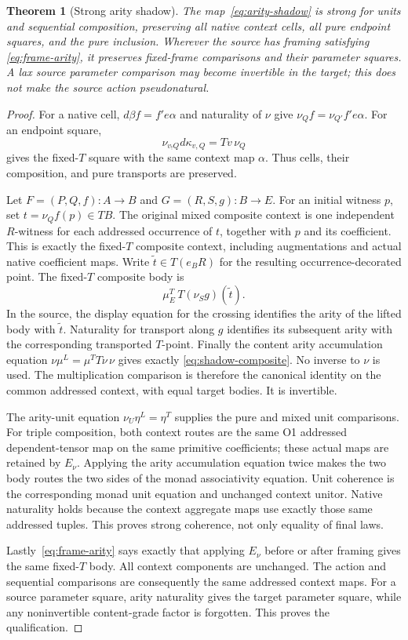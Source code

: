 \documentclass[11pt,a4paper]{article}
\newtheorem{theorem}{Theorem}[section]
\theoremstyle{definition}
\begin{document}
\begin{theorem}[Strong arity shadow]\label{thm:arity-shadow}
The map~\eqref{eq:arity-shadow} is strong for units and sequential
composition, preserving all native context cells, all pure endpoint squares,
and the pure inclusion. Wherever the source has framing satisfying
\eqref{eq:frame-arity}, it preserves fixed-frame comparisons and their
parameter squares. A lax source parameter comparison may become invertible
in the target; this does not make the source action pseudonatural.
\end{theorem}
\begin{proof}
For a native cell, $d\beta f=f'e\alpha$ and naturality of $\nu$ give
$\nu_Qf=\nu_{Q'}f'e\alpha$. For an endpoint square,
\[
 \nu_{v_!Q}d\kappa_{v,Q}=Tv\,\nu_Q
\]
gives the fixed-$T$ square with the same context map $\alpha$.
Thus cells, their composition, and pure transports are preserved.

Let $F=(P,Q,f):A\to B$ and $G=(R,S,g):B\to E$. For an initial witness
$p$, set $t=\nu_Qf(p)\in TB$. The original mixed composite context is
one independent $R$-witness for each addressed occurrence of $t$, together
with $p$ and its coefficient. This is exactly the fixed-$T$ composite
context, including augmentations and actual native coefficient maps.
Write $\widetilde t\in T(e_BR)$ for the resulting occurrence-decorated
point. The fixed-$T$ composite body is
\begin{equation}\label{eq:shadow-composite}
 \mu^T_E\,T(\nu_Sg)(\widetilde t).
\end{equation}
In the source, the display equation for the crossing identifies the arity
of the lifted body with $\widetilde t$. Naturality for transport along
$g$ identifies its subsequent arity with the corresponding transported
$T$-point. Finally the content arity accumulation equation
$\nu\mu^L=\mu^T T\nu\,\nu$ gives exactly
\eqref{eq:shadow-composite}. No inverse to $\nu$ is used.
The multiplication comparison is therefore the canonical identity on the
common addressed context, with equal target bodies. It is invertible.

The arity-unit equation $\nu_U\eta^L=\eta^T$ supplies the pure and mixed
unit comparisons. For triple composition, both context routes are the
same O1 addressed dependent-tensor map on the same primitive coefficients;
these actual maps are retained by $E_\nu$. Applying the arity accumulation
equation twice makes the two body routes the two sides of the monad
associativity equation. Unit coherence is the corresponding monad unit
equation and unchanged context unitor. Native naturality holds because the
context aggregate maps use exactly those same addressed tuples. This
proves strong coherence, not only equality of final laws.

Lastly~\eqref{eq:frame-arity} says exactly that applying $E_\nu$ before
or after framing gives the same fixed-$T$ body. All context components
are unchanged. The action and sequential comparisons are consequently the
same addressed context maps. For a source parameter square, arity
naturality gives the target parameter square, while any noninvertible
content-grade factor is forgotten. This proves the qualification.
\end{proof}
\end{document}
